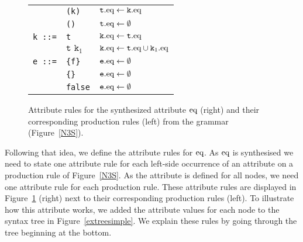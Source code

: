 \begin{figure}
\begin{tabular}{lll}
      & \texttt{(k)}& $\texttt{t}.\text{eq} \leftarrow\texttt{k}.\text{eq}$\\
      & \texttt{()}& $\texttt{t}.\text{eq} \leftarrow\emptyset$\\
\texttt{k ::=}& \texttt{t}& $\texttt{k}.\text{eq} \leftarrow\texttt{t}.\text{eq}$\\
&$\texttt{t k}_1$ & $\texttt{k}.\text{eq} \leftarrow\texttt{t}.\text{eq}\cup\texttt{k}_1.\text{eq}$\\
\texttt{e ::=}&\texttt{\{f\}} &                $\texttt{e}.\text{eq} \leftarrow\emptyset$\\
       &\texttt{\{\}} &  $\texttt{e}.\text{eq} \leftarrow\emptyset$\\
       &\texttt{false}       &                $\texttt{e}.\text{eq} \leftarrow\emptyset$\\
  \hline
\end{tabular}
  \normalsize
\caption{Attribute rules for the synthesized attribute $\text{eq}$ (right) and their corresponding production rules (left) from the \nthree grammar (Figure~\ref{N3S}).\label{EQ}}
\end{figure}
%
%

Following that idea, we define the attribute rules for $\text{eq}$.
As $\text{eq}$ is synthesised %
we need to state one attribute rule  for each left-side occurrence of an attribute on a production rule of Figure~\ref{N3S}. 
As the attribute is defined for all nodes, we need one attribute rule for each production rule.
% 
% 
% 
% 
% 
These attribute rules are displayed in Figure~\ref{EQ} (right) next to their corresponding production rules (left). 
To illustrate how this attribute works, we added the attribute values for each node to the syntax tree in Figure~\ref{extreesimple}.
We explain these rules by going through the tree %
beginning at the bottom.

